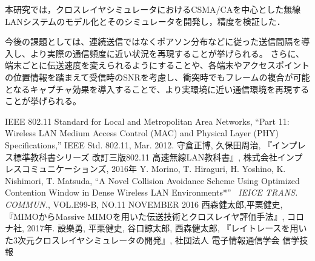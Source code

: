\documentclass[a4paper,10pt]{ltjsarticle}
\begin{document}
本研究では，クロスレイヤシミュレータにおけるCSMA/CAを中心とした無線LANシステムのモデル化とそのシミュレータを開発し，精度を検証した．

今後の課題としては、連続送信ではなくポアソン分布などに従った送信間隔を導入し、より実際の通信頻度に近い状況を再現することが挙げられる。
さらに、端末ごとに伝送速度を変えられるようにすることや、各端末やアクセスポイントの位置情報を踏まえて受信時のSNRを考慮し、衝突時でもフレームの複合が可能となるキャプチャ効果を導入することで、より実環境に近い通信環境を再現することが挙げられる。



\clearpage
{}
\begin{thebibliography}{99}
  
  IEEE 802.11 Standard for Local and Metropolitan Area
  Networks, “Part 11: Wireless LAN Medium Access Control (MAC) and Physical Layer (PHY) Speciﬁcations,”  IEEE Std. 802.11, Mar. 2012.
守倉正博, 久保田周治, 『インプレス標準教科書シリーズ 改訂三版802.11 高速無線LAN教科書』, 株式会社インプレスコミュニケーションズ, 2016年
Y. Morino, T. Hiraguri, H. Yoshino, K. Nishimori, T. Matsuda, ``A Novel Collision Avoidance Scheme Using Optimized Contention Window in Dense Wireless LAN Environments*'' \, \textit{IEICE TRANS. COMMUN.}, VOL.E99-B, NO.11 NOVEMBER 2016
西森健太郎,平栗健史,『MIMOからMassive MIMOを用いた伝送技術とクロスレイヤ評価手法』, コロナ社, 2017年.
設樂勇, 平栗健史, 谷口諒太郎, 西森健太郎, 『レイトレースを用いた3次元クロスレイヤシミュレータの開発』, 社団法人 電子情報通信学会 信学技報
\end{thebibliography}
\end{document}
